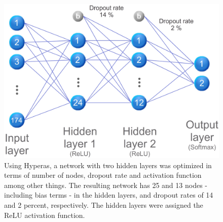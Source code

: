 \begin{figure}[h]
	\centering
	\includegraphics[scale=0.5]{figs_temp/optimized_network_graph.jpg}
	\caption{Using Hyperas, a network with two hidden layers was optimized in terms of number of nodes, dropout rate and activation function among other things. The resulting network has 25 and 13 nodes - including bias terms - in the hidden layers, and dropout rates of 14 and 2 percent, respectively. The hidden layers were assigned the ReLU activation function.}
	\label{fig:opt_net}
\end{figure}








